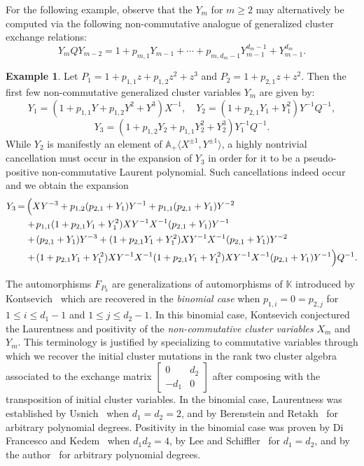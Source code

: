 \documentclass[10pt]{amsart}
\theoremstyle{definition}
\newtheorem*{exam*}{Example}
\renewcommand{\AA}{\mathbb{A}}
\newcommand{\KK}{\mathbb{K}}
\newenvironment{introexample}{\begin{exam*}}{\end{exam*}}
\newcommand*{\Mk}{\mkern -2mu}
\begin{document}
 For the following example, observe that the $Y_m$ for $m\ge2$ may alternatively be computed via the following non-commutative analogue of generalized cluster exchange relations:
 \begin{equation}
 \label{eq:non-commutative exchange relation}
 Y_mQY_{m-2}=1+p_{m,1}Y_{m-1}+\cdots+p_{m,d_m-1}Y_{m-1}^{d_m-1}+Y_{m-1}^{d_m}.
 \end{equation}
 \begin{introexample}
 Let $P_1=1+p_{1,1}z+p_{1,2}z^2+z^3$ and $P_2=1+p_{2,1}z+z^2$.
 Then the first few non-commutative generalized cluster variables $Y_m$ are given by:
 \[ Y_1=(1+p_{1,1}Y+p_{1,2}Y^2+Y^3)X^{-1}, \quad Y_2=(1+p_{2,1}Y_1+Y_1^2)Y^{-1}Q^{-1},\]
 \[Y_3=(1+p_{1,2}Y_2+p_{1,1}Y_2^2+Y_2^3)Y_1^{-1}Q^{-1}.\]
 While $Y_2$ is manifestly an element of $\AA_+\langle X^{\pm1},Y^{\pm1}\rangle$, a highly nontrivial cancellation must occur in the expansion of $Y_3$ in order for it to be a pseudo-positive non-commutative Laurent polynomial.
 Such cancellations indeed occur and we obtain the expansion
 \begin{align*}
 Y_3&\Mk =\Mk 
 \Big(XY^{-3}+p_{1,2}(p_{2,1}+Y_1)Y^{-1}+p_{1,1}(p_{2,1}+Y_1)Y^{-2}\\
 &\quad +\Mk p_{1,1}(1+p_{2,1}Y_1+Y_1^2)XY^{-1}X^{-1}(p_{2,1}+Y_1)Y^{-1}\\
 &\quad +\Mk (p_{2,1}+Y_1)Y^{-3}+(1+p_{2,1}Y_1+Y_1^2)XY^{-1}X^{-1}(p_{2,1}+Y_1)Y^{-2}\\
 &\quad +\Mk (1+p_{2,1}Y_1+Y_1^2)XY^{-1}X^{-1}(1+p_{2,1}Y_1+Y_1^2)XY^{-1}X^{-1}(p_{2,1}+Y_1)Y^{-1}\Big)Q^{-1}.
 \end{align*}
 \end{introexample}

 The automorphisms $F_{P_k}$ are generalizations of automorphisms of $\KK$ introduced by Kontsevich~\cite{kontsevich} which are recovered in the \emph{binomial case} when $p_{1,i}=0=p_{2,j}$ for $1\le i\le d_1-1$ and $1\le j\le d_2-1$.
 In this binomial case, Kontsevich conjectured the Laurentness and positivity of the \emph{non-commutative cluster variables} $X_m$ and $Y_m$.
 This terminology is justified by specializing to commutative variables through which we recover the initial cluster mutations in the rank two cluster algebra~\cite{fomin-zelevinsky} associated to the exchange matrix $\left[\begin{array}{cc} 0 & d_2\\ -d_1 & 0\end{array}\right]$ after composing with the transposition of initial cluster variables.
 In the binomial case, Laurentness was established by Usnich~\cite{usnich0} when $d_1=d_2=2$, and by Berenstein and Retakh~\cite{berenstein-retakh} for arbitrary polynomial degrees.
 Positivity in the binomial case was proven by Di Francesco and Kedem~\cite{difrancesco-kedem} when $d_1d_2=4$, by Lee and Schiffler~\cite{lee-schiffler} for $d_1=d_2$, and by the author~\cite{rupel1} for arbitrary polynomial degrees.
\end{document}
